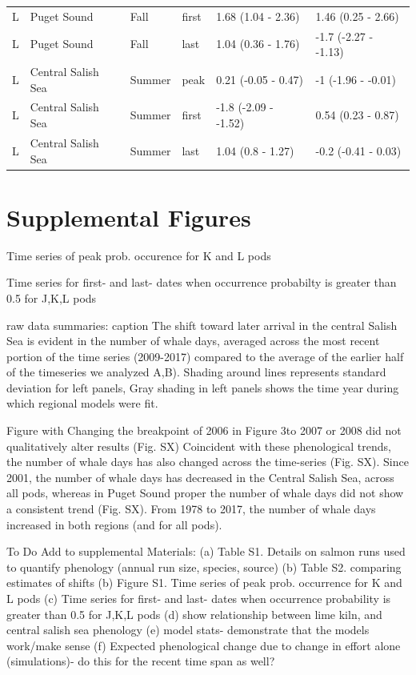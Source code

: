 \documentclass{article}
\begin{document}
\begin{table}[ht]
\begin{tabular}{|p{}|p{}|p{}|p{}|p{}|p{}|}
  L & Puget Sound & Fall & first & 1.68 (1.04 - 2.36) & 1.46 (0.25 - 2.66) \\ 
  L & Puget Sound & Fall & last & 1.04 (0.36 - 1.76) & -1.7 (-2.27 - -1.13) \\ 
  L & Central Salish Sea & Summer & peak & 0.21 (-0.05 - 0.47) & -1 (-1.96 - -0.01) \\ 
  L & Central Salish Sea & Summer & first & -1.8 (-2.09 - -1.52) & 0.54 (0.23 - 0.87) \\ 
  L & Central Salish Sea & Summer & last & 1.04 (0.8 - 1.27) & -0.2 (-0.41 - 0.03) \\ 
  \end{tabular}
\endgroup
\end{table}


\section* {Supplemental Figures}
\par Time series of peak prob. occurence for K and L pods
\par Time series for first- and last- dates when occurrence probabilty is greater than 0.5 for J,K,L pods
\par raw data summaries: caption The shift toward later arrival in the central Salish Sea is evident in the number of whale days, averaged across the most recent portion of the time series (2009-2017) compared to the average of the earlier half of the timeseries we analyzed  A,B).  Shading around lines represents standard deviation for left panels, Gray shading in left panels shows the time year during which regional models were fit.


\par Figure with Changing the breakpoint of 2006 in Figure 3to 2007 or 2008 did not qualitatively alter results (Fig. SX)
Coincident with these phenological trends, the number of whale days has also changed across the time-series (Fig. SX). Since 2001, the number of whale days has decreased in the Central Salish Sea, across all pods, whereas in Puget Sound proper the number of whale days did not show a consistent trend (Fig. SX). From 1978 to 2017, the number of whale days increased in both regions (and for all pods). 
\par To Do 
Add to supplemental Materials: 
(a) Table S1. Details on salmon runs used to quantify phenology (annual run size, species, source)
(b) Table S2. comparing estimates of shifts 
(b) Figure S1. Time series of peak prob. occurrence for K and L pods 
(c) Time series for first- and last- dates when occurrence probability is greater than 0.5 for J,K,L pods 
(d) show relationship between lime kiln, and central salish sea phenology
(e) model stats- demonstrate that the models work/make sense 
(f) Expected phenological change due to change in effort alone (simulations)- do this for the recent time span as well?
\end{document}
